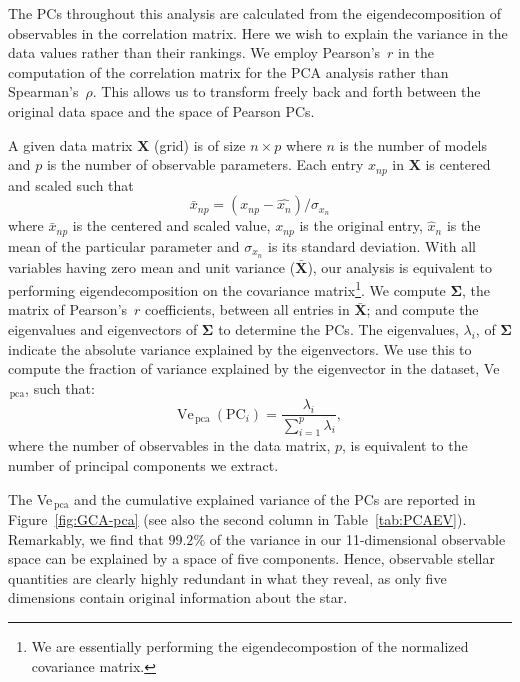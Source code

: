 The PCs throughout this analysis are calculated from the eigendecomposition of observables in the correlation matrix. Here we wish to explain the variance in the data values rather than their rankings. 
 We employ Pearson's~$r$ in the computation of the correlation matrix for the PCA analysis rather than Spearman's~$\rho$. This allows us to transform freely back and forth between the original data space and the space of Pearson PCs.  
 
A given data matrix $\mathbf{X}$ (grid) is of size ${n \times p}$ where $n$ is the number of models  and $p$ is the number of observable parameters. 
Each entry $x_{np}$ in $\mathbf{X}$ is centered and scaled such that 
\begin{equation}
\bar{x}_{np} = (x_{np} -\hat{x_n})/\sigma_{x_n}
\end{equation}
where $\bar{x}_{np}$ is the centered and scaled value,  $x_{np}$ is the original entry, $\hat{x}_n$ is the mean of the particular parameter and $\sigma_{x_n}$ is its standard deviation. 
With all variables having zero mean and unit variance ($\mathbf{\bar{X}}$), our analysis is equivalent to performing eigendecomposition on the covariance matrix\footnote{We are essentially performing the eigendecompostion of the normalized covariance matrix.}. 
We compute $\boldsymbol\Sigma$, the matrix of Pearson's~$r$  coefficients, between all entries in $\mathbf{\bar{X}}$; and compute the eigenvalues and eigenvectors of $\boldsymbol\Sigma$ to determine the PCs.
The eigenvalues, $\lambda_i$, of $\boldsymbol\Sigma$ indicate the absolute variance explained by the eigenvectors. We use this to compute the fraction of variance explained by the eigenvector in the dataset, Ve$_{\, \text{pca}}$, such that:
\begin{equation}
\text{Ve}_{\, \text{pca}} \ (\text{PC}_i)=\frac{\lambda_i}{\sum_{i=1}^p \lambda_i}, 
\label{eqn:pcaev}
\end{equation}
where the number of observables in the data matrix, $p$, is equivalent to the number of principal components we extract.




The Ve$_{\,\text{pca}}$ and the cumulative explained variance of the PCs are reported in Figure~\ref{fig:GCA-pca} (see also the second column in Table~\ref{tab:PCAEV}).
Remarkably, we find that $99.2\%$ of the variance in our 11-dimensional observable space can be explained by a space of five components.
Hence, observable stellar quantities are clearly highly redundant in what they reveal, as only five dimensions contain original information about the star. 


